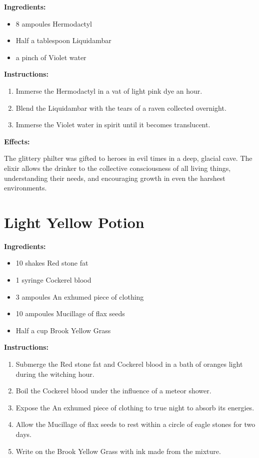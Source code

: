 \documentclass{article}
\begin{document}
\textbf{Ingredients:}

\begin{itemize}
  \item 8 ampoules Hermodactyl
  \item Half a tablespoon Liquidambar
  \item a pinch of Violet water
\end{itemize}

\textbf{Instructions:}

\begin{enumerate}
  \item Immerse the Hermodactyl in a vat of light pink dye an hour.
  \item Blend the Liquidambar with the tears of a raven collected overnight.
  \item Immerse the Violet water in spirit until it becomes translucent.
\end{enumerate}

\textbf{Effects:}

The glittery philter was gifted to heroes in evil times in a deep, glacial cave. The elixir allows the drinker to the collective consciousness of all living things, understanding their needs, and encouraging growth in even the harshest environments.

\newpage
\section*{Light Yellow Potion}

\textbf{Ingredients:}

\begin{itemize}
  \item 10 shakes Red stone fat
  \item 1 syringe Cockerel blood
  \item 3 ampoules An exhumed piece of clothing
  \item 10 ampoules Mucillage of flax seeds
  \item Half a cup Brook Yellow Grass
\end{itemize}

\textbf{Instructions:}

\begin{enumerate}
  \item Submerge the Red stone fat and Cockerel blood in a bath of oranges light during the witching hour.
  \item Boil the Cockerel blood under the influence of a meteor shower.
  \item Expose the An exhumed piece of clothing to true night to absorb its energies.
  \item Allow the Mucillage of flax seeds to rest within a circle of eagle stones for two days.
  \item Write on the Brook Yellow Grass with ink made from the mixture.
\end{enumerate}
\end{document}
